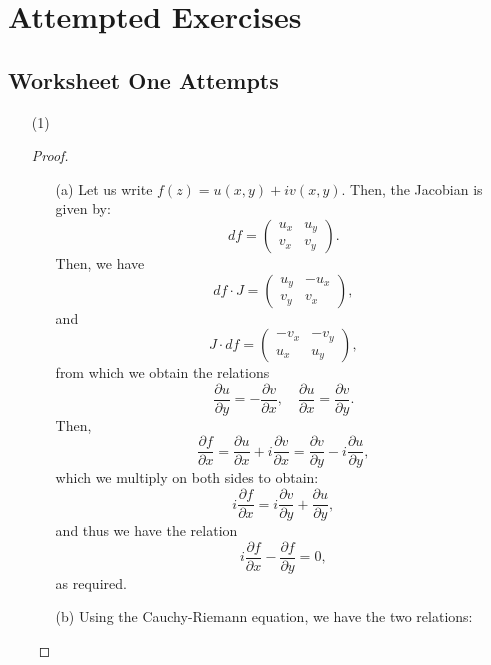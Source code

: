 \documentclass[a4paper]{report}
\theoremstyle{definition}
\theoremstyle{remark}
\theoremstyle{proposition}
\theoremstyle{conjecture}
\theoremstyle{lemma}
\theoremstyle{corollary}
\theoremstyle{exercise}
\theoremstyle{example}
\begin{document}
\chapter{Attempted Exercises}
\section{Worksheet One Attempts}
\begin{enumerate}
    \item[(1)]
        \begin{proof}
            \leavevmode
            \begin{itemize}
                \item[(a)] 
                    Let us write $f(z) = u(x,y) + iv(x,y)$. 
                    Then, the Jacobian is given by:
                    $$df = \begin{pmatrix}
                        u_x & u_y\\
                        v_x & v_y
                    \end{pmatrix}.$$
                    Then, we have
                    $$df \cdot J = \begin{pmatrix}
                        u_y & -u_x\\
                        v_y & v_x
                    \end{pmatrix},$$
                    and $$J \cdot df = \begin{pmatrix}
                        -v_x & -v_y\\
                        u_x & u_y
                    \end{pmatrix},$$
                    from which we obtain the relations 
                    $$\frac{\partial u}{\partial y} = -\frac{\partial v}{\partial x}, \quad \frac{\partial u}{\partial x} = \frac{\partial v}{\partial y}.$$
                    Then, $$\frac{\partial f}{\partial x} = \frac{\partial u}{\partial x} + i\frac{\partial v}{\partial x} = \frac{\partial v}{\partial y} -i \frac{\partial u}{\partial y},$$
                    which we multiply on both sides to obtain:
                    $$i\frac{\partial f}{\partial x} = i\frac{\partial v}{\partial y} + \frac{\partial u}{\partial y},$$
                    and thus we have the relation
                    $$i\frac{\partial f}{\partial x} - \frac{\partial f}{\partial y} = 0,$$
                    as required.
                \item[(b)] 
                    Using the Cauchy-Riemann equation, 
                    we have the two relations:

\end{itemize}
\end{proof}
\end{enumerate}
\end{document}

